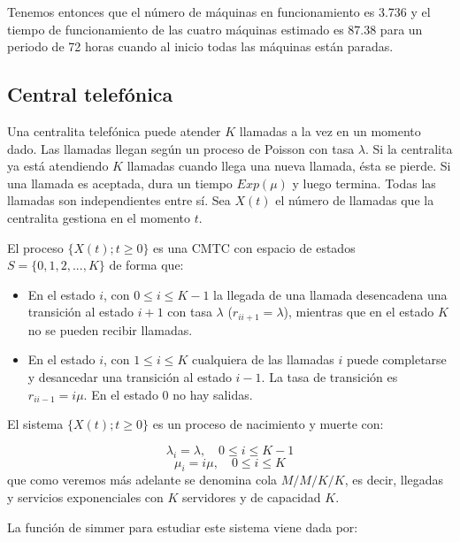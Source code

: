 \documentclass[
]{book}
\theoremstyle{definition}
\theoremstyle{definition}
\theoremstyle{definition}
\theoremstyle{definition}
\theoremstyle{remark}
\begin{document}
Tenemos entonces que el número de máquinas en funcionamiento es 3.736 y el tiempo de funcionamiento de las cuatro máquinas estimado es 87.38 para un periodo de 72 horas cuando al inicio todas las máquinas están paradas.

\hypertarget{central-telefuxf3nica}{%
\subsection{Central telefónica}\label{central-telefuxf3nica}}

Una centralita telefónica puede atender \(K\) llamadas a la vez en un momento dado. Las llamadas llegan según un proceso de Poisson con tasa \(\lambda\). Si la centralita ya está atendiendo \(K\) llamadas cuando llega una nueva llamada, ésta se pierde. Si una llamada es aceptada, dura un tiempo \(Exp(\mu)\) y luego termina. Todas las llamadas son independientes entre sí. Sea \(X(t)\) el número de llamadas que la centralita gestiona en el momento \(t\).

El proceso \(\{X(t); t \geq 0\}\) es una CMTC con espacio de estados \(S = \{0, 1, 2,...,K\}\) de forma que:

\begin{itemize}
\item
  En el estado \(i\), con \(0 \leq i \leq K-1\) la llegada de una llamada desencadena una transición al estado \(i+1\) con tasa \(\lambda\) (\(r_{i i+1} = \lambda\)), mientras que en el estado \(K\) no se pueden recibir llamadas.
\item
  En el estado \(i\), con \(1 \leq i \leq K\) cualquiera de las llamadas \(i\) puede completarse y desancedar una transición al estado \(i-1\). La tasa de transición es \(r_{i i-1} = i\mu\). En el estado 0 no hay salidas.
\end{itemize}

El sistema \(\{X(t); t \geq 0\}\) es un proceso de nacimiento y muerte con:

\[\lambda_i = \lambda, \quad 0 \leq i \leq K-1\] \[\mu_i = i\mu, \quad 0 \leq i \leq K\] que como veremos más adelante se denomina cola \(M/M/K/K\), es decir, llegadas y servicios exponenciales con \(K\) servidores y de capacidad \(K\).

La función de simmer para estudiar este sistema viene dada por:
\end{document}
